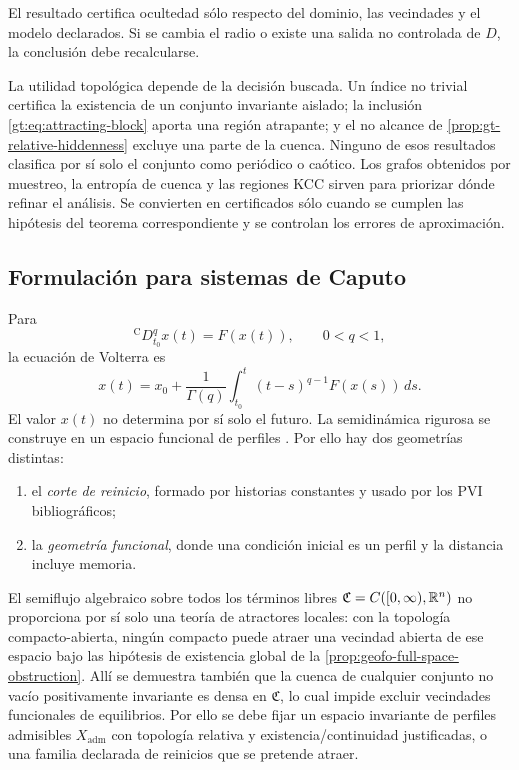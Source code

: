 El resultado certifica ocultedad sólo respecto del dominio, las vecindades y
el modelo declarados. Si se cambia el radio o existe una salida no controlada
de $D$, la conclusión debe recalcularse.

La utilidad topológica depende de la decisión buscada. Un índice no trivial
certifica la existencia de un conjunto invariante aislado; la inclusión
\eqref{gt:eq:attracting-block} aporta una región atrapante; y el no alcance de
\cref{prop:gt-relative-hiddenness} excluye una parte de la cuenca. Ninguno de
esos resultados clasifica por sí solo el conjunto como periódico o caótico.
Los grafos obtenidos por muestreo, la entropía de cuenca y las regiones KCC
sirven para priorizar dónde refinar el análisis. Se convierten en certificados
sólo cuando se cumplen las hipótesis del teorema correspondiente y se controlan
los errores de aproximación.
\fi

\subsection{Formulación para sistemas de Caputo}
\label{subsec:gt-caputo-transfer}

Para
\begin{equation}
 {}^{\mathrm C}D_{t_0}^{q}x(t)=F(x(t)),
 \qquad 0<q<1,
 \label{gt:eq:caputo}
\end{equation}
la ecuación de Volterra es
\begin{equation}
 x(t)=x_0+\frac1{\Gamma(q)}
 \int_{t_0}^{t}(t-s)^{q-1}F(x(s))\,ds.
 \label{gt:eq:caputo-volterra}
\end{equation}
El valor $x(t)$ no determina por sí solo el futuro. La semidinámica rigurosa se
construye en un espacio funcional de perfiles
\cite{CongTuan2017Nonlocal,DoanKloeden2021Semidynamical,
DoanKloeden2024Attractors}. Por ello hay dos geometrías distintas:

\begin{enumerate}
 \item el \emph{corte de reinicio}, formado por historias constantes y usado
 por los PVI bibliográficos;
 \item la \emph{geometría funcional}, donde una condición inicial es un perfil
 y la distancia incluye memoria.
\end{enumerate}

El semiflujo algebraico sobre todos los términos libres
$\mathfrak C=C([0,\infty),\mathbb{R}^n)$ no proporciona por sí solo una teoría de
atractores locales: con la topología compacto-abierta, ningún compacto puede
atraer una vecindad abierta de ese espacio bajo las hipótesis de existencia
global de la \cref{prop:geofo-full-space-obstruction}. Allí se demuestra también
que la cuenca de cualquier conjunto no vacío positivamente invariante es
densa en $\mathfrak C$, lo cual impide excluir vecindades funcionales de
equilibrios. Por ello se debe fijar un espacio invariante de perfiles
admisibles $X_{\mathrm{adm}}$ con topología relativa y existencia/continuidad
justificadas, o una familia declarada de reinicios que se pretende atraer.

